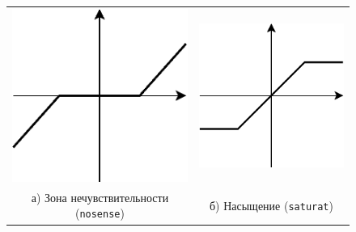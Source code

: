 \begin{figure}[h]
\centering
\begin{tabular}{cc}
\includegraphics{func_nosense} &
\includegraphics{func_saturat} \\
а) Зона нечувствительности ({\tt nosense})& б) Насыщение ({\tt saturat}) \\

\end{tabular}
\end{figure}
